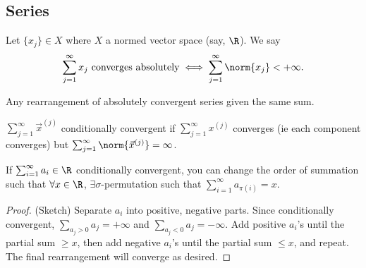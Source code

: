 \subsection{Series}

\begin{definition}
    Let $\{x_j\} \in X$ where $X$ a normed vector space (say, $\R$). We say \[
    \sum_{j=1}^\infty x_j \text{ converges absolutely} \iff \sum_{j=1}^\infty \norm{x_j} < + \infty.    
    \]
\end{definition}
\begin{theorem}
    Any rearrangement of absolutely convergent series given the same sum.
\end{theorem}

\begin{definition}
    $\sum_{j=1}^\infty \vec{x}^{(j)}$ conditionally convergent if $\sum_{j=1}^\infty x^{(j)}$ converges (ie each component converges) but $\sum_{j=1}^\infty \norm{\vec{x}^{(j)}} = \infty$.
\end{definition}

\begin{theorem}
    If $\sum_{i=1}^\infty a_i \in \R$ conditionally convergent, you can change the order of summation such that $\forall x \in \R$, $\exists \sigma$-permutation such that $\sum_{i=1}^\infty a_{\pi(i)} = x$.
\end{theorem}
\begin{proof}(Sketch)
    Separate $a_i$ into positive, negative parts. Since conditionally convergent, $\sum_{a_j > 0} a_j = +\infty$ and $\sum_{a_j < 0} a_j = - \infty$. Add positive $a_i$'s until the partial sum $\geq x$, then add negative $a_i$'s until the partial sum $\leq x$, and repeat. The final rearrangement will converge as desired.
\end{proof}